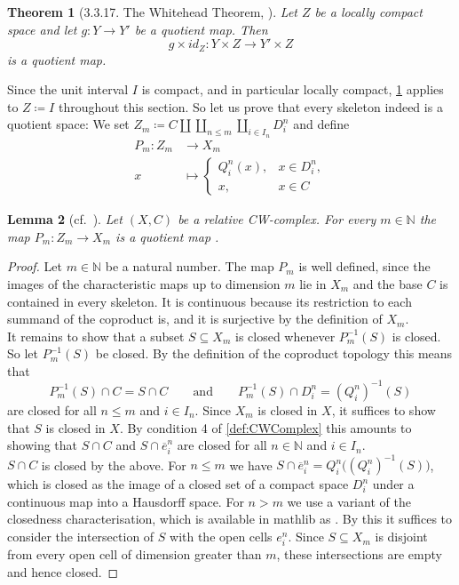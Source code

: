 \documentclass[11pt, a4paper, english]{article}
\newcommand{\openCell}[2]{e^{#1}_{#2}}
\newcommand{\closedCell}[2]{\overline{e}^{#1}_{#2}}
\theoremstyle{plain}
\newtheorem{theorem}{Theorem}
\newtheorem{lemma}[theorem]{Lemma}
\theoremstyle{definition}
\theoremstyle{remark}
\numberwithin{equation}{section}
\numberwithin{theorem}{section}
\begin{document}
\begin{theorem} [3.3.17. The Whitehead Theorem, \cite{RYS}] \label{thm:quotientproduct}
    Let $Z$ be a locally compact space and let $g \colon Y \to Y'$ be a quotient map. Then
    \[
        g \times id_Z \colon Y \times Z \to Y' \times Z
    \]
    is a quotient map.
\end{theorem}
Since the unit interval $I$ is compact, and in particular locally compact, \cref{thm:quotientproduct} applies to $Z \coloneqq I$ throughout this section. So let us prove that every skeleton indeed is a quotient space:
We set $ Z_m \coloneqq C \amalg \coprod_{n \le m} \coprod_{i\in I_n}  D_i^n $ and define  
\begin{align*} 
        P_m : Z_m &\to X_m \\
        x &\mapsto \begin{cases}
        Q_i^n (x), & x \in  D_i^n, \\
        x, &  x \in C
        \end{cases}
\end{align*}

\begin{lemma} [cf.\ {\cite[Satz~4.1.11]{SZ}}] \label{lem:skeletonquotient}
    Let $(X,C)$ be a relative CW-complex. For every $m \in \mathbb{N}$ the map $ P_m : Z_m \to X_m$ is a quotient map .
\end{lemma}

\begin{proof}
Let $m \in \mathbb{N}$ be a natural number. The map $P_m$ is well defined, since the images of the characteristic maps up to dimension $m$ lie in $X_m$ and the base $C$ is contained in every skeleton. It is continuous because its restriction to each summand of the coproduct is, and it is surjective by the definition of $X_m$.\\
It remains to show that a subset $S \subseteq X_m$ is closed whenever $P_m^{-1}(S)$ is closed. So let $P_m^{-1}(S)$ be closed. By the definition of the coproduct topology this means that
    \[
        P_m^{-1}(S) \cap C = S \cap C
        \qquad\text{and}\qquad
        P_m^{-1}(S) \cap D_i^n = (Q_i^n)^{-1}(S)
    \]
are closed for all $n \le m$ and $i \in I_n$. Since $X_m$ is closed in $X$, it suffices to show that $S$ is closed in $X$. By condition 4 of \cref{def:CWComplex} this amounts to showing that $S \cap C$ and $S \cap \closedCell{n}{i}$ are closed for all $n \in \mathbb{N}$ and $i \in I_n$. \\
$S \cap C$ is closed by the above. For $n \le m$ we have $S \cap \closedCell{n}{i} = Q_i^n\big((Q_i^n)^{-1}(S)\big) $, which is closed as the image of a closed set of a compact space $D_i^n$ under a continuous map into a Hausdorff space. For $n > m$ we use a variant of the closedness characterisation, which is available in mathlib as . By this it suffices to consider the intersection of $S$ with the open cells $\openCell{n}{i}$. Since $S \subseteq X_m$ is disjoint from every open cell of dimension greater than $m$, these intersections are empty and hence closed.
\end{proof}
\end{document}
